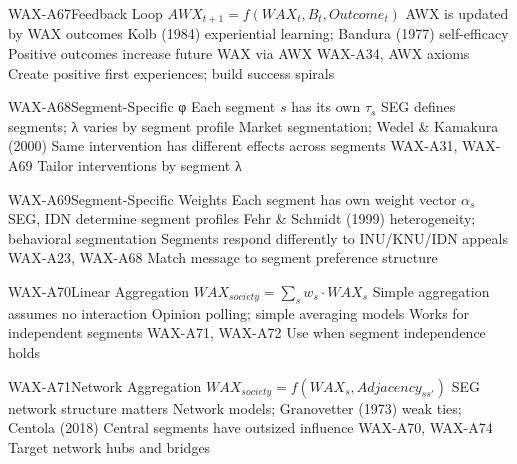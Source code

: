\begin{axiomspec}{WAX-A67}{Feedback Loop}
 $AWX_{t+1} = f(WAX_t, B_t, Outcome_t)$
 AWX is updated by WAX outcomes
 Kolb (1984) experiential learning; Bandura (1977) self-efficacy
 Positive outcomes increase future WAX via AWX
 WAX-A34, AWX axioms
 Create positive first experiences; build success spirals
\end{axiomspec}


\begin{axiomspec}{WAX-A68}{Segment-Specific φ}
 Each segment $s$ has its own $\tau_s$
 SEG defines segments; λ varies by segment profile
 Market segmentation; Wedel \& Kamakura (2000)
 Same intervention has different effects across segments
 WAX-A31, WAX-A69
 Tailor interventions by segment λ
\end{axiomspec}

\begin{axiomspec}{WAX-A69}{Segment-Specific Weights}
 Each segment has own weight vector $\alpha_s$
 SEG, IDN determine segment profiles
 Fehr \& Schmidt (1999) heterogeneity; behavioral segmentation
 Segments respond differently to INU/KNU/IDN appeals
 WAX-A23, WAX-A68
 Match message to segment preference structure
\end{axiomspec}

\begin{axiomspec}{WAX-A70}{Linear Aggregation}
 $WAX_{society} = \sum_s w_s \cdot WAX_s$
 Simple aggregation assumes no interaction
 Opinion polling; simple averaging models
 Works for independent segments
 WAX-A71, WAX-A72
 Use when segment independence holds
\end{axiomspec}

\begin{axiomspec}{WAX-A71}{Network Aggregation}
 $WAX_{society} = f(WAX_s, Adjacency_{ss'})$
 SEG network structure matters
 Network models; Granovetter (1973) weak ties; Centola (2018)
 Central segments have outsized influence
 WAX-A70, WAX-A74
 Target network hubs and bridges
\end{axiomspec}

